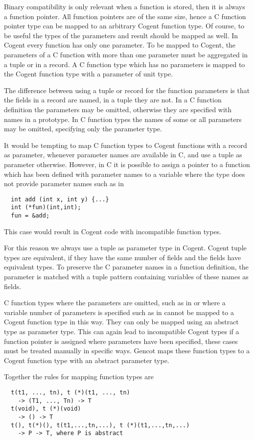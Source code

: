 Binary compatibility is only relevant when a function is stored, then it is always a function pointer. All function
pointers are of the same size, hence a C function pointer type can be mapped to an arbitrary Cogent function type.
Of course, to be useful the types of the parameters and result should be mapped as well. In Cogent every function
has only one parameter. To be mapped to Cogent, the parameters of a C function with more than one parameter must
be aggregated in a tuple or in a record. A C function type  which has no parameters is mapped
to the Cogent function type  with a parameter of unit type.

The difference between using a tuple or record for the function parameters is that the fields in a 
record are named, in a tuple they are not. In 
a C function definition the parameters may be omitted, otherwise they are specified with names in a prototype.
In C function types the names of some or all parameters may be omitted, specifying only the parameter type.

It would be tempting to map C function types to Cogent functions with a record as parameter, whenever parameter 
names are available in C, and use a tuple as parameter otherwise. However, in C it is possible to assign a 
pointer to a function which has been defined 
with parameter names to a variable where the type does not provide parameter names such as in 
\begin{verbatim}
  int add (int x, int y) {...}
  int (*fun)(int,int);
  fun = &add;
\end{verbatim}
This case would result in Cogent code with incompatible function types.

For this reason we always use a tuple as parameter type in Cogent. Cogent tuple types are equivalent, if they
have the same number of fields and the fields have equivalent types. To preserve the C parameter names in 
a function definition, the parameter is matched with a tuple pattern containing variables of these
names as fields.

C function types where the parameters are omitted, such as in  or where a variable number of
parameters is specified such as in  cannot be mapped to a Cogent function type in this way. 
They can only be mapped using an abstract type as parameter type. This can again lead to incompatible 
Cogent types if a function pointer is assigned where parameters have been specified, these cases must 
be treated manually in specific ways. Gencot maps these function types to a Cogent function type with an abstract
parameter type.

Together the rules for mapping function types are
\begin{verbatim}
  t(t1, ..., tn), t (*)(t1, ..., tn) 
    -> (T1, ..., Tn) -> T
  t(void), t (*)(void) 
    -> () -> T
  t(), t(*)(), t(t1,...,tn,...), t (*)(t1,...,tn,...) 
    -> P -> T, where P is abstract
\end{verbatim}

 
